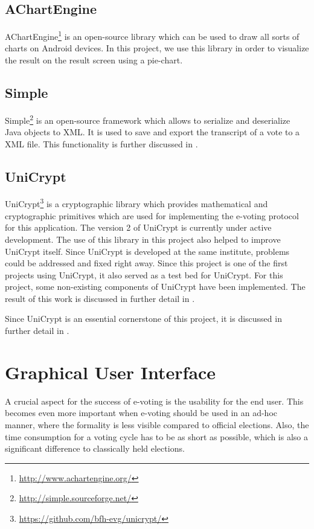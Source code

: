 \documentclass[numbers=noenddot, abstract=on, a4paper, headsepline,
footsepline, oneside, draft=off]{scrreprt}
\begin{document}
\subsection{AChartEngine}
AChartEngine\footnote{\url{http://www.achartengine.org/}} is an open-source
library which can be used to draw all sorts of charts on Android devices. In
this project, we use this library in order to visualize the result on the
result screen using a pie-chart.

\subsection{Simple}
Simple\footnote{\url{http://simple.sourceforge.net/}} is an open-source
framework which allows to serialize and deserialize Java objects to XML. It is
used to save and export the transcript of a vote to a XML file. This
functionality is further discussed in . 

\subsection{UniCrypt}
UniCrypt\footnote{\url{https://github.com/bfh-evg/unicrypt/}} is a cryptographic
library which provides mathematical and cryptographic primitives which are used
for implementing the e-voting protocol for this application. The version 2 of
UniCrypt is currently under active development. The use of this library in this
project also helped to improve UniCrypt itself. Since UniCrypt is developed at
the same institute, problems could be addressed and fixed right away. Since
this project is one of the first projects using UniCrypt, it also served as a test
bed for UniCrypt. For this project, some non-existing components of UniCrypt
have been implemented. The result of this work is discussed in further detail in
.

Since UniCrypt is an essential cornerstone of this project, it is discussed in
further detail in .

\section{Graphical User Interface}
\label{sec:gui}
A crucial aspect for the success of e-voting is the usability for the end user.
This becomes even more important when e-voting should be used in an ad-hoc
manner, where the formality is less visible compared to official elections.
Also, the time consumption for a voting cycle has to be as short as possible,
which is also a significant difference to classically held elections.
\end{document}
